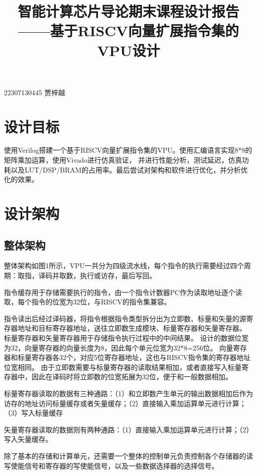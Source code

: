 \documentclass[UTF8]{ctexart}
\begin{document}
\title{智能计算芯片导论期末课程设计报告 \\——基于RISCV向量扩展指令集的VPU设计}
\maketitle
\begin{center}
	22307130445 贾梓越
\end{center}

\section{设计目标}
使用Verilog搭建一个基于RISCV向量扩展指令集的VPU。使用汇编语言实现8*8的矩阵乘加运算，使用Vivado进行仿真验证，
并进行性能分析，测试延迟，仿真功耗以及LUT/DSP/BRAM的占用率。最后尝试对架构和软件进行优化，并分析优化的效果。
\section{设计架构}
\subsection{整体架构}
整体架构如图1所示，VPU一共分为四级流水线，每个指令的执行需要经过四个周期：取指，译码并取数，执行或访存，最后写回。

指令缓存用于存储需要执行的指令，由一个指令计数器PC作为读取地址逐个读取，每个指令的位宽为32位，与RISCV的指令集兼容。

指令读出后经过译码器，将指令根据指令类型拆分出为立即数、标量和矢量的源寄存器地址和目标寄存器地址，送往立即数生成模块、标量寄存器和矢量寄存器。
标量寄存器和矢量寄存器用于存储指令执行过程中的中间结果。
设计的数据位宽为32，向量寄存器的向量长度为8，因此每个单元位宽为32*8=256位。
向量寄存器和标量寄存器各32个，对应5位寄存器地址，这也与RISCV指令集的寄存器地址位宽相同。
由于立即数需要与标量寄存器的读取结果相加，或者直接写入标量寄存器中，因此在译码时将立即数的位宽拓展为32位，便于和一般数据相加。

标量寄存器读取的数据有三种通路：（1）和立即数产生单元的输出数据相加后作为访存的地址访问标量缓存或者矢量缓存；（2）直接输入乘加运算单元进行计算；（3）写入标量缓存

矢量寄存器读取的数据则有两种通路：（1）直接输入乘加运算单元进行计算；（2）写入矢量缓存。

除了基本的存储和计算单元，还需要一个整体的控制单元负责控制各个存储器的读写使能信号和寄存器的写使能信号，以及一些数据选择器的选择信号。
\end{document}
